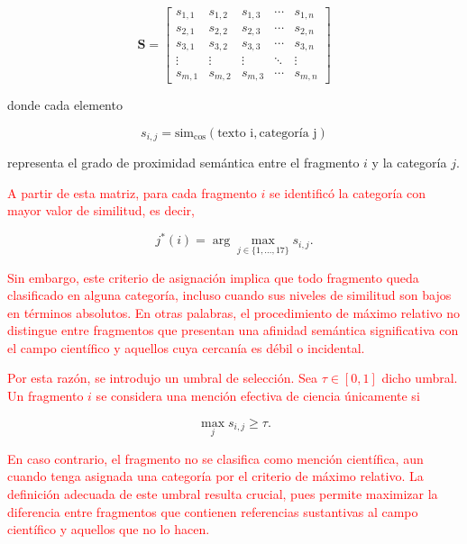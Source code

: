 \documentclass[11pt,a4paper]{article}
\begin{document}
\begin{equation}
	\mathbf{S} =
	\begin{bmatrix}
		s_{1,1} & s_{1,2} & s_{1,3} & \cdots & s_{1,n} \\
		s_{2,1} & s_{2,2} & s_{2,3} & \cdots & s_{2,n} \\
		s_{3,1} & s_{3,2} & s_{3,3} & \cdots & s_{3,n} \\
		\vdots  & \vdots  & \vdots  & \ddots & \vdots  \\
		s_{m,1} & s_{m,2} & s_{m,3} & \cdots & s_{m,n}
	\end{bmatrix}
\end{equation}

donde cada elemento

\[
s_{i,j} = \text{sim}_{\cos}(\text{texto i}, \text{categoría j})
\]

representa el grado de proximidad semántica entre el fragmento $i$ y la categoría $j$.

\textcolor{red}{A partir de esta matriz, para cada fragmento $i$ se identificó la categoría con mayor valor de similitud, es decir,}

\[
j^*(i) = \arg\max_{j \in \{1,\dots,17\}} s_{i,j}.
\]

\textcolor{red}{Sin embargo, este criterio de asignación implica que todo fragmento queda clasificado en alguna categoría, incluso cuando sus niveles de similitud son bajos en términos absolutos. En otras palabras, el procedimiento de máximo relativo no distingue entre fragmentos que presentan una afinidad semántica significativa con el campo científico y aquellos cuya cercanía es débil o incidental.}

\textcolor{red}{Por esta razón, se introdujo un umbral de selección. Sea $\tau \in [0,1]$ dicho umbral. Un fragmento $i$ se considera una mención efectiva de ciencia únicamente si}

\[
\max_{j} s_{i,j} \geq \tau.
\]

\textcolor{red}{En caso contrario, el fragmento no se clasifica como mención científica, aun cuando tenga asignada una categoría por el criterio de máximo relativo. La definición adecuada de este umbral resulta crucial, pues permite maximizar la diferencia entre fragmentos que contienen referencias sustantivas al campo científico y aquellos que no lo hacen.}
	
\end{document}
